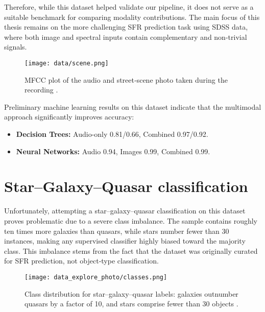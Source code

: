 \documentclass[english,bachelor,oneside]{ctufit-thesis}
\begin{document}
Therefore, while this dataset helped validate our pipeline, it does not serve as a suitable benchmark for comparing modality contributions. The main focus of this thesis remains on the more challenging SFR prediction task using SDSS data, where both image and spectral inputs contain complementary and non-trivial signals.

\begin{figure}[h]
    \centering
    \texttt{[image: data/scene.png]}
    \caption{MFCC plot of the audio and street‐scene photo taken during the recording \cite{scene}.}
    \label{fig:prism}
\end{figure}

Preliminary machine learning results on this dataset indicate that the multimodal approach significantly improves accuracy:
\begin{itemize}
    \item \textbf{Decision Trees:} Audio-only 0.81/0.66, Combined 0.97/0.92.
    \item \textbf{Neural Networks:} Audio 0.94, Images 0.99, Combined 0.99.
\end{itemize}

\section{Star–Galaxy–Quasar classification}

Unfortunately, attempting a star–galaxy–quasar classification on this dataset proves problematic due to a severe class imbalance. The sample contains roughly ten times more galaxies than quasars, while stars number fewer than 30 instances, making any supervised classifier highly biased toward the majority class. This imbalance stems from the fact that the dataset was originally curated for SFR prediction, not object‐type classification.
\begin{figure}[H]
  \centering
  \texttt{[image: data\_explore\_photo/classes.png]}
  \caption{Class distribution for star–galaxy–quasar labels: galaxies outnumber quasars by a factor of 10, and stars comprise fewer than 30 objects \cite{data_exploring}.}
  \label{fig:class_distribution}
\end{figure}
\end{document}
